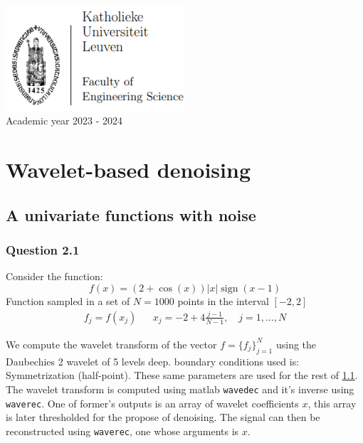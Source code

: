 \documentclass[a4paper]{article}
\DeclareMathOperator*{\sign}{sign}
\begin{document}
\begin{titlepage}
\begin{center}
			\includegraphics[width=0.5\textwidth]{Images/KUL_Eng_logo.png}\\
			{\Large{Academic year 2023 - 2024}}
			
		\end{center}
	\end{titlepage}
	
	\newpage
	
	\tableofcontents
	
	\lstlistoflistings
	
	\newpage

    \section{Wavelet-based denoising}
 
	\subsection{A univariate functions with noise} \label{subsec:UniVariate}

    \subsubsection{Question 2.1}

	Consider the function:
    \begin{equation} \label{eq:func}
	f(x) = (2+\cos{(x)}) |x| \sign{(x-1)}
	\end{equation}
    Function sampled in a set of $N=1000$ points in the interval $[-2,2]$
    \begin{align*}
    	f_j = f(x_j) && x_j = -2 + 4\frac{j-1}{N-1}, \quad j=1,\ldots,N
    \end{align*}
    
    We compute the wavelet transform of the vector $f = \{f_j\}_{j=1}^N$ using the Daubechies 2 wavelet of 5 levels deep. boundary conditions used is: Symmetrization (half-point). These same parameters are used for the rest of \cref{subsec:UniVariate}. The wavelet transform is computed using matlab \texttt{wavedec} and it's inverse using \texttt{waverec}. One of former's outputs is an array of wavelet coefficients $x$, this array is later thresholded for the propose of denoising. The signal can then be reconstructed using \texttt{waverec}, one whose arguments is $x$.
    
\end{document}

